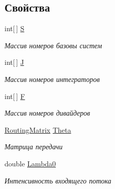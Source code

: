 \subsection*{Свойства}
\begin{DoxyCompactItemize}
\item 
int\mbox{[}$\,$\mbox{]} \hyperlink{class_networks_1_1_open_fork_join_network_a3081d74c0bb207dc059d4e7819c0791e}{S}
\begin{DoxyCompactList}\small\item\em Массив номеров базовы систем \end{DoxyCompactList}\item 
int\mbox{[}$\,$\mbox{]} \hyperlink{class_networks_1_1_open_fork_join_network_abb49a6f019bb66407f47d123a42e12e2}{J}
\begin{DoxyCompactList}\small\item\em Массив номеров интеграторов \end{DoxyCompactList}\item 
int\mbox{[}$\,$\mbox{]} \hyperlink{class_networks_1_1_open_fork_join_network_a7ac77530707bda1d810cc2ed1863873c}{F}
\begin{DoxyCompactList}\small\item\em Массив номеров дивайдеров \end{DoxyCompactList}\item 
\hyperlink{class_networks_1_1_routing_matrix}{Routing\+Matrix} \hyperlink{class_networks_1_1_open_fork_join_network_a3cc59e2da1ed4cd8efc9c799664d6590}{Theta}
\begin{DoxyCompactList}\small\item\em Матрица передачи \end{DoxyCompactList}\item 
double \hyperlink{class_networks_1_1_open_fork_join_network_a0e64e4ae41267b61cc4ceb06479cbaed}{Lambda0}
\begin{DoxyCompactList}\small\item\em Интенсивность входящего потока \end{DoxyCompactList}\item 

\end{DoxyCompactItemize}
